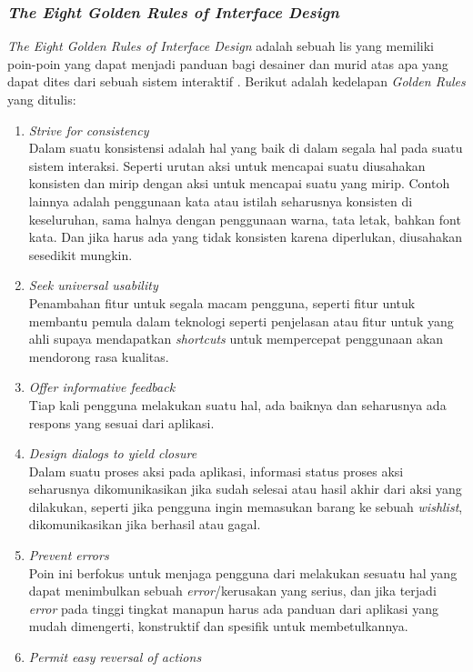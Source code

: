 \documentclass[a4paper]{article}
\newcommand{\subsubbab}[1]{%
    \subsubsection{#1}%
}
\begin{document}
\subsubbab{\textit{The Eight Golden Rules of Interface Design}}
\textit{The Eight Golden Rules of Interface Design} adalah sebuah lis yang memiliki poin-poin yang dapat menjadi panduan bagi desainer dan murid atas apa yang dapat dites dari sebuah sistem interaktif \autocite{Shneiderman_Plaisant_Cohen_Jacobs_Elmqvist_2018_eight_golden_rules}. Berikut adalah kedelapan \textit{Golden Rules} yang ditulis:
\begin{enumerate}
    \item \textit{Strive for consistency}\\
    Dalam suatu konsistensi adalah hal yang baik di dalam segala hal pada suatu sistem interaksi. Seperti urutan aksi untuk mencapai suatu diusahakan konsisten dan mirip dengan aksi untuk mencapai suatu yang mirip. Contoh lainnya adalah penggunaan kata atau istilah seharusnya konsisten di keseluruhan, sama halnya dengan penggunaan warna, tata letak, bahkan font kata. Dan jika harus ada yang tidak konsisten karena diperlukan, diusahakan sesedikit mungkin.
    \item \textit{Seek universal usability}\\
    Penambahan fitur untuk segala macam pengguna, seperti fitur untuk membantu pemula dalam teknologi seperti penjelasan atau fitur untuk yang ahli supaya mendapatkan \textit{shortcuts} untuk mempercepat penggunaan akan mendorong rasa kualitas.
    \item \textit{Offer informative feedback}\\
    Tiap kali pengguna melakukan suatu hal, ada baiknya dan seharusnya ada respons yang sesuai dari aplikasi.
    \item \textit{Design dialogs to yield closure}\\
    Dalam suatu proses aksi pada aplikasi, informasi status proses aksi seharusnya dikomunikasikan jika sudah selesai atau hasil akhir dari aksi yang dilakukan, seperti jika pengguna ingin memasukan barang ke sebuah \textit{wishlist}, dikomunikasikan jika berhasil atau gagal.
    \item \textit{Prevent errors}\\
    Poin ini berfokus untuk menjaga pengguna dari melakukan sesuatu hal yang dapat menimbulkan sebuah \textit{error}/kerusakan yang serius, dan jika terjadi \textit{error} pada tinggi tingkat manapun harus ada panduan dari aplikasi yang mudah dimengerti, konstruktif dan spesifik untuk membetulkannya.
    \item \textit{Permit easy reversal of actions}\\

\end{enumerate}
\end{document}
